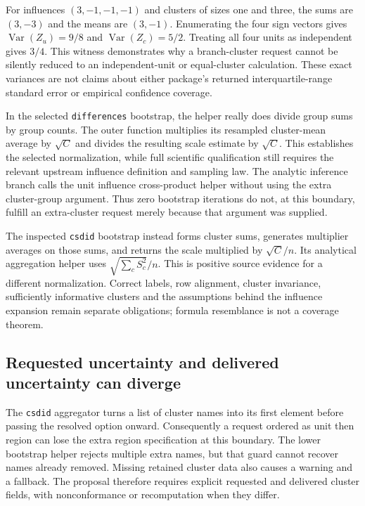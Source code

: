 For influences $(3,-1,-1,-1)$ and clusters of sizes one and three, the sums
are $(3,-3)$ and the means are $(3,-1)$. Enumerating the four sign vectors
gives $\operatorname{Var}(Z_u)=9/8$ and
$\operatorname{Var}(Z_c)=5/2$. Treating all four units as independent gives
$3/4$. This witness demonstrates why a branch-cluster request cannot be
silently reduced to an independent-unit or equal-cluster calculation.
These exact variances are not claims about either package's returned
interquartile-range standard error or empirical confidence coverage.
\citep{exec24_panelpy_contract}

In the selected \texttt{differences} bootstrap, the helper really does divide
group sums by group counts. The outer function multiplies its resampled
cluster-mean average by $\sqrt C$ and divides the resulting scale estimate
by $\sqrt C$. This establishes the selected normalization, while full
scientific qualification still requires the relevant upstream influence
definition and sampling law. The analytic inference branch calls the
unit influence cross-product helper without using the extra cluster-group
argument. Thus zero bootstrap iterations do not, at this boundary, fulfill
an extra-cluster request merely because that argument was supplied.
\citep{exec24_panelpy_differences}

The inspected \texttt{csdid} bootstrap instead forms cluster sums, generates
multiplier averages on those sums, and returns the scale multiplied by
$\sqrt C/n$. Its analytical aggregation helper uses
$\sqrt{\sum_c S_c^2}/n$. This is positive source evidence for a different
normalization. Correct labels, row alignment, cluster invariance, sufficiently
informative clusters and the assumptions behind the influence expansion
remain separate obligations; formula resemblance is not a coverage theorem.
\citep{exec24_panelpy_csdid}

\subsection{Requested uncertainty and delivered uncertainty can diverge}
The \texttt{csdid} aggregator turns a list of cluster names into its first
element before passing the resolved option onward. Consequently a request
ordered as unit then region can lose the extra region specification at this
boundary. The lower bootstrap helper rejects multiple extra names, but that
guard cannot recover names already removed. Missing retained cluster data
also causes a warning and a fallback. The proposal therefore requires
explicit requested and delivered cluster fields, with nonconformance or
recomputation when they differ.
\citep{exec24_panelpy_csdid,exec24_panelpy_contract}

